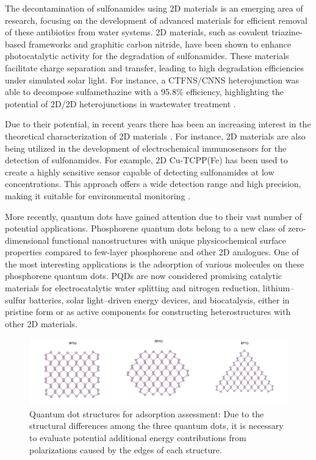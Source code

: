 \documentclass[preprint,12pt]{elsarticle}
\begin{document}
	The decontamination of sulfonamides using 2D materials is an emerging area of research, focusing on the development of advanced materials for efficient removal of these antibiotics from water systems. 2D materials, such as covalent triazine-based frameworks and graphitic carbon nitride, have been shown to enhance photocatalytic activity for the degradation of sulfonamides. These materials facilitate charge separation and transfer, leading to high degradation efficiencies under simulated solar light. For instance, a CTFNS/CNNS heterojunction was able to decompose sulfamethazine with a 95.8\% efficiency, highlighting the potential of 2D/2D heterojunctions in wastewater treatment \cite{Cao2020Metal-free}.
	
	Due to their potential, in recent years there has been an increasing interest in the theoretical characterization of 2D materials \cite{Manikandan2019}. For instance, 2D materials are also being utilized in the development of electrochemical immunosensors for the detection of sulfonamides. For example, 2D Cu-TCPP(Fe) has been used to create a highly sensitive sensor capable of detecting sulfonamides at low concentrations. This approach offers a wide detection range and high precision, making it suitable for environmental monitoring \cite{Xiao2019A}.
	
	More recently, quantum dots have gained attention due to their vast number of potential applications. Phosphorene quantum dots \cite{Abdelsalam2019} belong to a new class of zero-dimensional functional nanostructures with unique physicochemical surface properties compared to few-layer phosphorene and other 2D analogues. One of the most interesting applications is the adsorption of various molecules on these phosphorene quantum dots. PQDs are now considered promising catalytic materials for electrocatalytic water splitting and nitrogen reduction, lithium–sulfur batteries, solar light–driven energy devices, and biocatalysis, either in pristine form or as active components for constructing heterostructures with other 2D materials.
	
	\begin{center}
		\begin{figure}[H]
			
			\label{f:Qds}
			\includegraphics[width=1\textwidth]{quantumDots.png}
			
			\caption{Quantum dot structures for adsorption assessment: Due to the structural differences among the three quantum dots, it is necessary to evaluate potential additional energy contributions from polarizations caused by the edges of each structure.}
			\label{f:Quantum_dots}
		\end{figure}
		
	\end{center}
	
\end{document}
